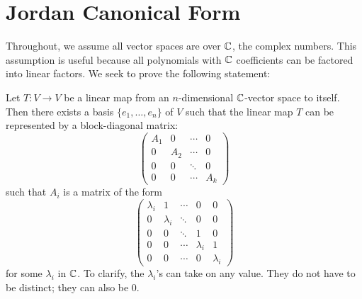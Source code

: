 \section{Jordan Canonical Form}

Throughout, we assume all vector spaces are over $\mathbb{C}$, the complex 
numbers. This assumption is useful because all polynomials with 
$\mathbb{C}$ coefficients can be factored into linear factors. We seek to 
prove the following statement:

\begin{thm}\label{thm:JCF}
Let $T : V \to V$ be a linear map from an $n$-dimensional 
$\mathbb{C}$-vector space to itself. Then there exists a basis 
$\{e_1,\dots,e_n\}$ of $V$ such that the linear map $T$
can be represented by a block-diagonal matrix:
\[
\left(
\begin{matrix}
A_1 &0   &\cdots &0 \\
0   &A_2 &\cdots &0 \\
0   &0   &\ddots &0 \\
0   &0   &\cdots &A_k
\end{matrix}
\right)
\]
such that $A_i$ is a matrix of the form
\begin{equation}\label{eq:jordan_block}
\left(
\begin{matrix}
\lambda_i & 1         & \cdots & 0         & 0 \\
0         & \lambda_i & \ddots & 0         & 0 \\
0         & 0         & \ddots & 1         & 0 \\
0         & 0         & \cdots & \lambda_i & 1 \\
0         & 0         & \cdots & 0         & \lambda_i
\end{matrix}
\right)
\end{equation}
for some $\lambda_i$ in $\mathbb{C}$. To clarify, the $\lambda_i$'s can 
take on any value. They do not have to be distinct; they can also
be 0.
\end{thm}

